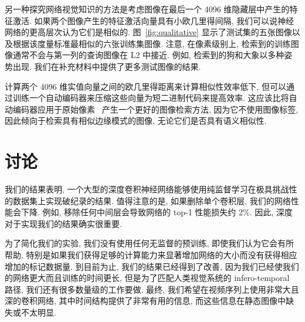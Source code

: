 \documentclass{article} %
\begin{document}
另一种探究网络视觉知识的方法是考虑图像在最后一个 4096 维隐藏层中产生的特征激活. 如果两个图像产生的特征激活向量具有小欧几里得间隔, 我们可以说神经网络的更高层次认为它们是相似的. 图~\ref{fig:qualitative} 显示了测试集的五张图像以及根据该度量标准最相似的六张训练集图像. 注意, 在像素级别上, 检索到的训练图像通常不会与第一列的查询图像在 L2 中接近. 例如, 检索到的狗和大象以多种姿势出现. 我们在补充材料中提供了更多测试图像的结果.

计算两个 4096 维实值向量之间的欧几里得距离来计算相似性效率低下, 但可以通过训练一个自动编码器来压缩这些向量为短二进制代码来提高效率. 这应该比将自动编码器应用于原始像素~\cite{krizhevsky2011} 产生一个更好的图像检索方法, 因为它不使用图像标签, 因此倾向于检索具有相似边缘模式的图像, 无论它们是否具有语义相似性.

\vspace{-2mm}
\section{讨论}
\vspace{-3ex}

我们的结果表明, 一个大型的深度卷积神经网络能够使用纯监督学习在极具挑战性的数据集上实现破纪录的结果. 值得注意的是, 如果删除单个卷积层, 我们的网络性能会下降. 例如, 移除任何中间层会导致网络的 top-1 性能损失约 2\%. 因此, 深度对于实现我们的结果确实很重要.

为了简化我们的实验, 我们没有使用任何无监督的预训练, 即使我们认为它会有所帮助, 特别是如果我们获得足够的计算能力来显著增加网络的大小而没有获得相应增加的标记数据量. 到目前为止, 我们的结果已经得到了改善, 因为我们已经使我们的网络更大而且训练的时间更长, 但是为了匹配人类视觉系统的 infero-temporal 路径, 我们还有很多数量级的工作要做. 最终, 我们希望在视频序列上使用非常大且深的卷积网络, 其中时间结构提供了非常有用的信息, 而这些信息在静态图像中缺失或不太明显.


%
%
%
%
%
%
%
%
%
\end{document}
